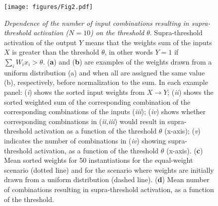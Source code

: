 
\begin{figure}[ht]
    \centering
    \texttt{[image: figures/Fig2.pdf]}
    \caption{
    \textit{Dependence of the number of input combinations resulting in supra-threshold activation ($N = 10$) on the threshold $\theta$}.
    Supra-threshold activation of the output $Y$ means that
        the weights sum of the inputs $X$ is greater than the threshold $\theta$,
        in other words $Y = 1$ if $\sum_i W_i x_i > \theta$.
    (\textbf{a}) and (\textbf{b}) are examples of the weights drawn from
        a uniform distribution (a)
        and when all are assigned the same value (b), respectively,
        before normalization to the sum.
    In each example panel:
        (\textit{i}) shows the sorted input weights from $X \to Y$;
        (\textit{ii}) shows the sorted weighted sum of the corresponding combination
        of the corresponding combinations of the inputs (\textit{iii});
        (\textit{iv}) shows whether corresponding combinations in (\textit{ii,iii}) would result in supra-threshold activation as a function of the threshold $\theta$ (x-axis);
        (\textit{v}) indicates the number of combinations in (\textit{iv}) showing supra-threshold activation, as a function of the threshold $\theta$ (x-axis).
    (\textbf{c}) Mean sorted weights for 50 instantiations for
        the equal-weight scenario (dotted line)
        and for the scenario where weights are initially drawn from a uniform distribution (dashed line).
    (\textbf{d}) Mean number of combinations resulting in supra-threshold activation, as a function of the threshold.
    }
    \label{fig:demo-simple}
\end{figure}